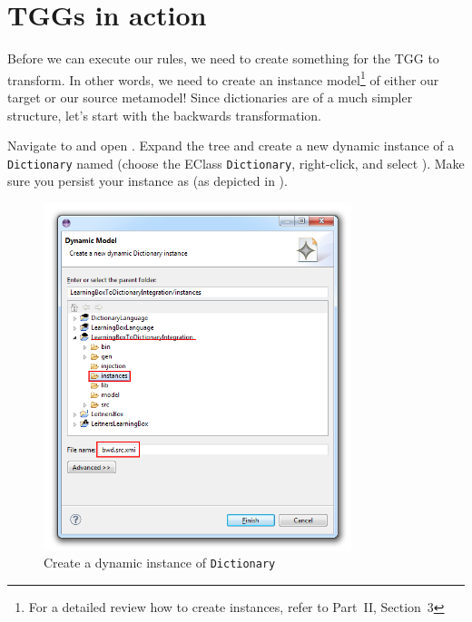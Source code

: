 \newpage
\chapter{TGGs in action}
\genHeader
\label{sect:TGGs_in_Action}

Before we can execute our rules, we need to create something for the TGG to transform. In other words, we need to create an instance model\footnote{For a
detailed review how to create instances, refer to Part~II, Section~3} of either our target or our source metamodel! Since dictionaries are of a much simpler structure, let's start with the backwards transformation.

\begin{stepbystep}

\item Navigate to  and open .
Expand the tree and create a new dynamic instance of a \texttt{Dictionary} named  (choose the EClass \texttt{Dictionary}, right-click, and select ). 
Make sure you persist your instance as  (as depicted in ).

\begin{figure}[htbp]
\begin{center}
  \includegraphics[width=0.8\textwidth]{../../org.moflon.doc.handbook.04_tripleGraphTransformations/5_inAction/aImages/eclipse_dictionaryInstance}
  \caption{Create a dynamic instance of \texttt{Dictionary}}
  \label{eclipse:create_instance_dict}
\end{center}
\end{figure}


\end{stepbystep}
